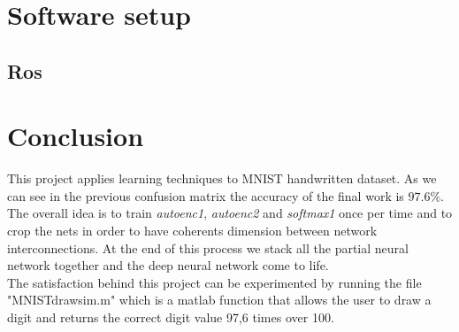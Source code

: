 \section{}
\chapter{Software setup}
\section{Ros}


\chapter*{Conclusion}
This project applies learning \cite{art:rif.1} techniques to MNIST handwritten dataset. As we can see in the previous confusion matrix the accuracy of the final work is $97.6\%$. The overall idea is to train \emph{autoenc1},  \emph{autoenc2} and \emph{softmax1} once per time and to crop the nets in order to have coherents dimension between network interconnections. At the end of \cite{book:rif.2}this process we stack all the partial neural network together and the deep neural network come to life. \\The satisfaction behind this project can be experimented by running the file "MNIST\textunderscore drawsim.m" which is a matlab function that allows the user to draw a digit and returns the correct digit value 97,6 times over 100.